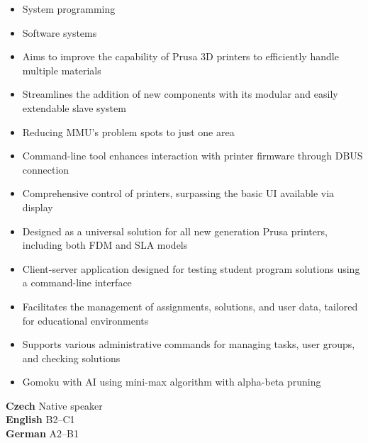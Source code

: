 

\begin{itemize}
\item System programming
\end{itemize}


\begin{itemize}
\item Software systems
\end{itemize}

\vspace{8px}


\begin{itemize}
\item Aims to improve the capability of Prusa 3D printers to efficiently handle multiple materials
\item Streamlines the addition of new components with its modular and easily extendable slave system
\item Reducing MMU's problem spots to just one area
\end{itemize}

\vspace{4px}

\begin{itemize}
\item Command-line tool enhances interaction with printer firmware through DBUS connection
\item Comprehensive control of printers, surpassing the basic UI available via display
\item Designed as a universal solution for all new generation Prusa printers, including both FDM and SLA models
\end{itemize}

\vspace{4px}

\begin{itemize}
\item Client-server application designed for testing student program solutions using a command-line interface
\item Facilitates the management of assignments, solutions, and user data, tailored for educational environments
\item Supports various administrative commands for managing tasks, user groups, and checking solutions
\end{itemize}

\vspace{4px}

\begin{itemize}
\item Gomoku with AI using mini-max algorithm with alpha-beta pruning
\end{itemize}

\vspace{8px}

\textbf{Czech} \hfill Native speaker \\
\textbf{English} \hfill B2--C1 \\
\textbf{German} \hfill A2--B1
